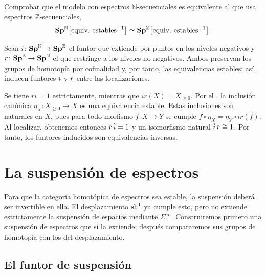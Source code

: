 \begin{ejer}\label{ejer:localizaciones-equivalentes}
Comprobar que el modelo con espectros $\mathbb N$-secuenciales es equivalente al que usa espectros $\mathbb Z$-secuenciales,
\[
\Sp^{\mathbb{N}}\bigl[\text{equiv.\ estables}^{-1}\bigr]\simeq\Sp^{\mathbb Z}\bigl[\text{equiv.\ estables}^{-1}\bigr].
\]
\end{ejer}
\begin{sol}
Sean $i\colon\mathbf{Sp}^{\mathbb N}\to\mathbf{Sp}^{\mathbb Z}$ el funtor que extiende por puntos en los niveles negativos y $r\colon\mathbf{Sp}^{\mathbb Z}\to\mathbf{Sp}^{\mathbb N}$ el que restringe a los niveles no negativos. Ambos preservan los grupos de homotopía por cofinalidad y, por tanto, las equivalencias estables; así, inducen funtores $\ubar i$ y $\ubar r$ entre las localizaciones.

Se tiene $ri=1$ estrictamente, mientras que $ir(X)=X_{\ge0}$. Por el , la inclusión canónica $\eta_X\colon X_{\ge0}\to X$ es una equivalencia estable. Estas inclusiones son naturales en $X$, pues para todo morfismo $f\colon X\to Y$ se cumple $f\circ\eta_X=\eta_Y\circ ir(f)$. Al localizar, obtenemos entonces $\ubar r\,\ubar i=1$ y un isomorfismo natural $\ubar i\,\ubar r\cong1$. Por tanto, los funtores inducidos son equivalencias inversas.
\end{sol}

\section{La suspensión de espectros}

Para que la categoría homotópica de espectros sea estable, la suspensión deberá ser invertible en ella. El desplazamiento $\operatorname{sh}^1$ ya cumple esto, pero no extiende estrictamente la suspensión de espacios mediante $\Sigma^\infty$. Construiremos primero una suspensión de espectros que sí la extiende; después compararemos sus grupos de homotopía con los del desplazamiento.

\subsection{El funtor de suspensión}

